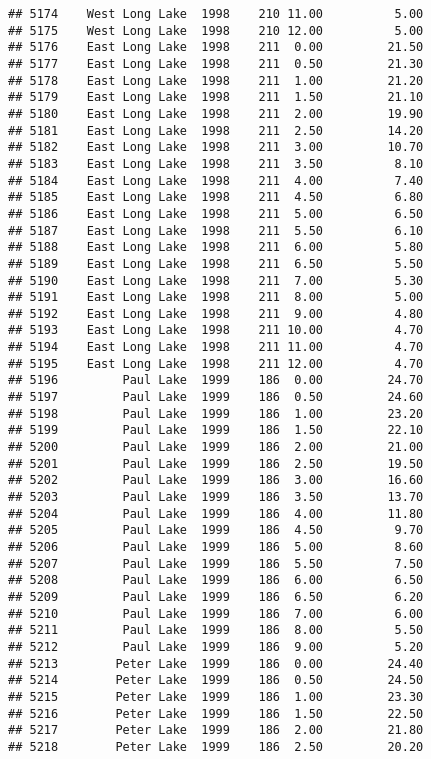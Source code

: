 \documentclass[
]{article}
\begin{document}
\begin{verbatim}
## 5174    West Long Lake  1998    210 11.00          5.00
## 5175    West Long Lake  1998    210 12.00          5.00
## 5176    East Long Lake  1998    211  0.00         21.50
## 5177    East Long Lake  1998    211  0.50         21.30
## 5178    East Long Lake  1998    211  1.00         21.20
## 5179    East Long Lake  1998    211  1.50         21.10
## 5180    East Long Lake  1998    211  2.00         19.90
## 5181    East Long Lake  1998    211  2.50         14.20
## 5182    East Long Lake  1998    211  3.00         10.70
## 5183    East Long Lake  1998    211  3.50          8.10
## 5184    East Long Lake  1998    211  4.00          7.40
## 5185    East Long Lake  1998    211  4.50          6.80
## 5186    East Long Lake  1998    211  5.00          6.50
## 5187    East Long Lake  1998    211  5.50          6.10
## 5188    East Long Lake  1998    211  6.00          5.80
## 5189    East Long Lake  1998    211  6.50          5.50
## 5190    East Long Lake  1998    211  7.00          5.30
## 5191    East Long Lake  1998    211  8.00          5.00
## 5192    East Long Lake  1998    211  9.00          4.80
## 5193    East Long Lake  1998    211 10.00          4.70
## 5194    East Long Lake  1998    211 11.00          4.70
## 5195    East Long Lake  1998    211 12.00          4.70
## 5196         Paul Lake  1999    186  0.00         24.70
## 5197         Paul Lake  1999    186  0.50         24.60
## 5198         Paul Lake  1999    186  1.00         23.20
## 5199         Paul Lake  1999    186  1.50         22.10
## 5200         Paul Lake  1999    186  2.00         21.00
## 5201         Paul Lake  1999    186  2.50         19.50
## 5202         Paul Lake  1999    186  3.00         16.60
## 5203         Paul Lake  1999    186  3.50         13.70
## 5204         Paul Lake  1999    186  4.00         11.80
## 5205         Paul Lake  1999    186  4.50          9.70
## 5206         Paul Lake  1999    186  5.00          8.60
## 5207         Paul Lake  1999    186  5.50          7.50
## 5208         Paul Lake  1999    186  6.00          6.50
## 5209         Paul Lake  1999    186  6.50          6.20
## 5210         Paul Lake  1999    186  7.00          6.00
## 5211         Paul Lake  1999    186  8.00          5.50
## 5212         Paul Lake  1999    186  9.00          5.20
## 5213        Peter Lake  1999    186  0.00         24.40
## 5214        Peter Lake  1999    186  0.50         24.50
## 5215        Peter Lake  1999    186  1.00         23.30
## 5216        Peter Lake  1999    186  1.50         22.50
## 5217        Peter Lake  1999    186  2.00         21.80
## 5218        Peter Lake  1999    186  2.50         20.20

\end{verbatim}
\end{document}
